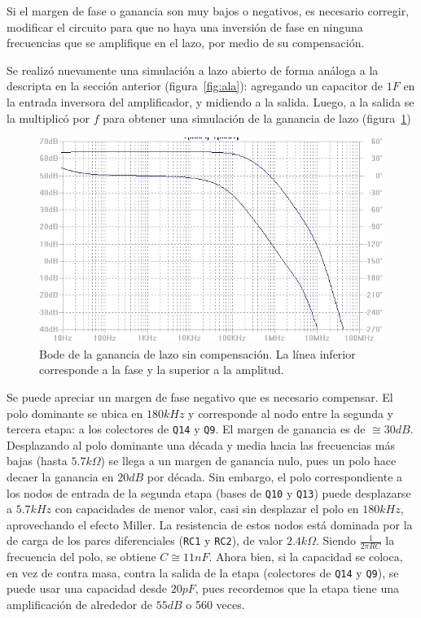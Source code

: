 Si el margen de fase o ganancia son muy bajos o negativos, es necesario corregir, modificar el circuito para que no haya una inversión de fase en ninguna frecuencias que se amplifique en el lazo, por medio de su compensación.


Se realizó nuevamente una simulación a lazo abierto de forma análoga a la descripta en la sección anterior (figura~\ref{fig:ala}): agregando un capacitor de $1F$ en la entrada inversora del amplificador, y midiendo a la salida. Luego, a la salida se la multiplicó por $f$ para obtener una simulación de la ganancia de lazo (figura~\ref{fig:bode-la-sin-comp})

\begin{figure}[H]
	\centering
	\includegraphics[height=0.4\textwidth]{img/sim/bode-la-sin-comp}
	\caption{Bode de la ganancia de lazo sin compensación. La línea inferior corresponde a la fase y la superior a la amplitud.}
	\label{fig:bode-la-sin-comp}
\end{figure}

Se puede apreciar un margen de fase negativo que es necesario compensar. El polo dominante se ubica en $180kHz$ y corresponde al nodo entre la segunda y tercera etapa: a los colectores de \texttt{Q14} y \texttt{Q9}. El margen de ganancia es de $\cong 30dB$. Desplazando al polo dominante una década y media hacia las frecuencias más bajas (hasta $5.7k\Omega$) se llega a un margen de ganancia nulo, pues un polo hace decaer la ganancia en $20dB$ por década. Sin embargo, el polo correspondiente a los nodos de entrada de la segunda etapa (bases de \texttt{Q10} y \texttt{Q13}) puede desplazarse a $5.7kHz$ con capacidades de menor valor, casi sin desplazar el polo en $180kHz$, aprovechando el efecto Miller. 
La resistencia de estos nodos está dominada por la de carga de los pares diferenciales (\texttt{RC1} y \texttt{RC2}), de valor $2.4k\Omega$. Siendo $\frac{1}{2 \pi RC}$ la frecuencia del polo, se obtiene $C\cong 11nF$. Ahora bien, si la capacidad se coloca, en vez de contra masa, contra la salida de la etapa (colectores de \texttt{Q14} y \texttt{Q9}), se puede usar una capacidad desde $20pF$, pues recordemos que la etapa tiene una amplificación de alrededor de $55dB$ o 560 veces. 

